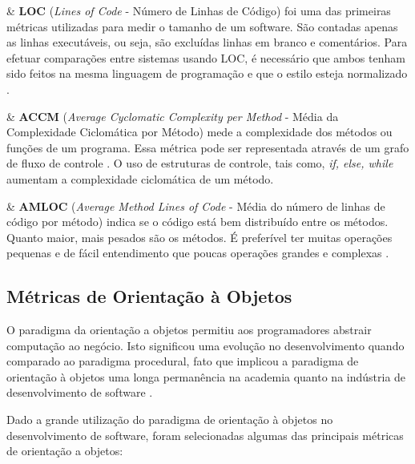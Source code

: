 \begin{easylist}[itemize]


	& \textbf{LOC} (\textit{Lines of Code} - Número de Linhas de Código)
	foi uma das primeiras métricas utilizadas para medir o tamanho de um 
	software. São contadas apenas as linhas executáveis, ou seja, são excluídas linhas em branco e comentários. Para efetuar comparações entre sistemas usando LOC, é necessário que ambos tenham sido feitos na mesma linguagem de programação e que o estilo esteja normalizado \cite{Jones91}.
	
	& \textbf{ACCM} (\textit{Average Cyclomatic Complexity per Method} - 
	Média da Complexidade Ciclomática por Método) mede a complexidade dos 
	métodos ou funções de um programa. Essa métrica pode ser representada 
	através de um grafo de fluxo de controle \cite{McCabe76}. O uso de 
	estruturas de controle, tais como, \textit{if, else, while} aumentam a 
	complexidade ciclomática de um método.

	& \textbf{AMLOC} (\textit{Average Method Lines of Code} - Média do número de linhas de código por método)  indica se o código está bem distribuído entre os métodos. Quanto maior, mais pesados são os métodos. É preferível ter muitas operações pequenas e de fácil entendimento que poucas operações grandes e complexas \cite{Meirelles2013}.

\end{easylist}


\subsection{Métricas de Orientação à Objetos}
\label{métrica objetos}
O paradigma da orientação a objetos permitiu aos programadores abstrair computação ao negócio. Isto significou uma evolução no desenvolvimento quando comparado ao paradigma procedural, fato que implicou a paradigma de orientação à objetos uma longa permanência na academia quanto na indústria de desenvolvimento de software \cite{Li1993}.

Dado a grande utilização do paradigma de orientação à objetos no desenvolvimento de software, foram selecionadas algumas das principais métricas de orientação a objetos:


